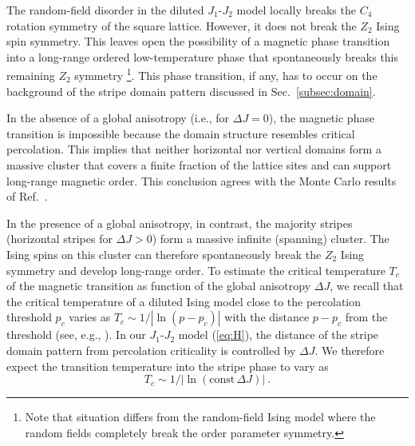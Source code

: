 \documentclass[twocolumn,showpacs,superscriptaddress,aps,prb]{revtex4-2}
\begin{document}
The random-field disorder in the diluted $J_1$-$J_2$ model locally breaks the $C_4$ rotation
symmetry of the square lattice. However, it does not break the $Z_2$ Ising spin symmetry.
This leaves open the possibility of a magnetic phase transition into a long-range ordered
low-temperature phase that spontaneously breaks this remaining $Z_2$ symmetry
\footnote{Note that situation differs from the random-field Ising model where the random fields
completely break the order parameter symmetry.}. This phase
transition, if any, has to occur on the background of the stripe domain pattern discussed
in Sec.\ \ref{subsec:domain}.

In the absence of a global anisotropy (i.e., for $\Delta J = 0$), the magnetic phase transition
is impossible because the domain structure resembles critical percolation. This implies that
neither horizontal nor vertical domains form a massive cluster that covers a
finite fraction of the lattice sites and can support long-range magnetic order. This conclusion
agrees with the Monte Carlo results of Ref.\ \cite{KunwarSenVojtaNarayanan18}.

In the presence of a global anisotropy, in contrast, the majority stripes
(horizontal stripes for $\Delta J > 0$) form a massive infinite (spanning) cluster. The
Ising spins on this cluster can therefore spontaneously break the $Z_2$ Ising symmetry
and develop long-range order. To estimate the critical temperature $T_c$ of the magnetic transition
as function of the global anisotropy $\Delta J$, we recall that the critical temperature
of a diluted Ising model close to the percolation threshold $p_c$ varies as $T_c \sim 1/|\ln(p-p_c)|$
with the distance $p-p_c$ from the threshold (see, e.g., \cite{StaufferAharony_book91,Cardy_book96}).
In our $J_1$-$J_2$ model (\ref{eq:H}), the distance of the stripe domain pattern from percolation
criticality is controlled by $\Delta J$. We therefore expect the transition temperature into the
stripe phase to vary as
\begin{equation}
T_c \sim 1/|\ln(\mathrm{const} \, \Delta J)|~.
\label{eq:Tc}
\end{equation}
\end{document}
